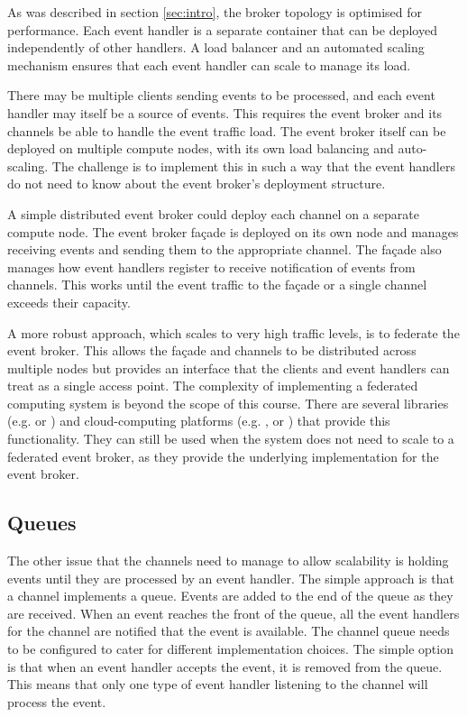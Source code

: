 As was described in section \ref{sec:intro}, the broker topology is optimised for performance.
Each event handler is a separate container that can be deployed independently of other handlers.
A load balancer and an automated scaling mechanism ensures that each event handler can scale to manage its load.

There may be multiple clients sending events to be processed,
and each event handler may itself be a source of events.
This requires the event broker and its channels be able to handle the event traffic load.
The event broker itself can be deployed on multiple compute nodes, with its own load balancing and auto-scaling.
The challenge is to implement this in such a way that the event handlers do not need to know about the event broker's deployment structure.

A simple distributed event broker could deploy each channel on a separate compute node.
The event broker façade is deployed on its own node and manages receiving events and sending them to the appropriate channel.
The façade also manages how event handlers register to receive notification of events from channels.
This works until the event traffic to the façade or a single channel exceeds their capacity.

A more robust approach, which scales to very high traffic levels, is to federate the event broker.
This allows the façade and channels to be distributed across multiple nodes
but provides an interface that the clients and event handlers can treat as a single access point.
The complexity of implementing a federated computing system is beyond the scope of this course.
There are several libraries (e.g.  or )
and cloud-computing platforms (e.g. ,
 or
) that provide this functionality.
They can still be used when the system does not need to scale to a federated event broker,
as they provide the underlying implementation for the event broker.

\subsection{Queues}

The other issue that the channels need to manage to allow scalability is holding events until they are processed by an event handler.
The simple approach is that a channel implements a queue.
Events are added to the end of the queue as they are received.
When an event reaches the front of the queue, all the event handlers for the channel are notified that the event is available.
The channel queue needs to be configured to cater for different implementation choices.
The simple option is that when an event handler accepts the event, it is removed from the queue.
This means that only one type of event handler listening to the channel will process the event.


